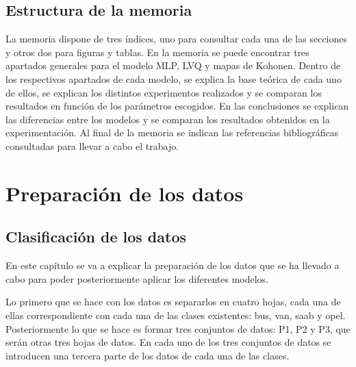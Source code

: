 \documentclass[11pt,spanish,listoffigures,listoftables]{workluis}
\begin{document}
\section{Estructura de la memoria}

\par La memoria dispone de tres índices, uno para consultar cada una de las secciones y otros dos para figuras y tablas. En la memoria se puede encontrar tres apartados generales para el modelo MLP, LVQ y mapas de Kohonen. Dentro de los respectivos apartados de cada modelo, se explica la base teórica de cada uno de ellos, se explican los distintos experimentos realizados y se comparan los resultados en función de los parámetros escogidos. En las conclusiones se explican las diferencias entre los modelos y se comparan los resultados obtenidos en la experimentación. Al final de la memoria se indican las referencias bibliográficas consultadas para llevar a cabo el trabajo.




\chapter{Preparación de los datos}

\section{Clasificación de los datos}

\par En este capítulo se va a explicar la preparación de los datos que se ha llevado a cabo para poder posteriormente aplicar los diferentes modelos.

\par Lo primero que se hace con los datos es separarlos en cuatro hojas, cada una de ellas correspondiente con cada una de las clases existentes: bus, van, saab y opel. Posteriormente lo que se hace es formar tres conjuntos de datos: P1, P2 y P3, que serán otras tres hojas de datos. En cada uno de los tres conjuntos de datos se introducen una tercera parte de los datos de cada una de las clases.
\end{document}
